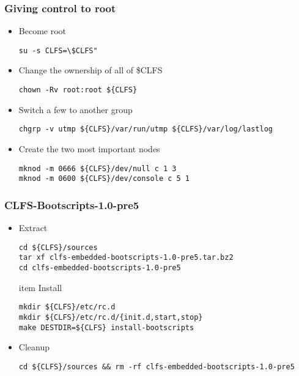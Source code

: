  \subsubsection{Giving control to root}
\begin{itemize}
  \item Become root
\begin{lstlisting}
su -s CLFS=\$CLFS"
\end{lstlisting}
  \item Change the ownership of all of \$CLFS
\begin{lstlisting}
chown -Rv root:root ${CLFS}
\end{lstlisting}
  \item Switch a few to another group
\begin{lstlisting}
chgrp -v utmp ${CLFS}/var/run/utmp ${CLFS}/var/log/lastlog
\end{lstlisting}
  \item Create the two most important nodes
\begin{lstlisting}
mknod -m 0666 ${CLFS}/dev/null c 1 3
mknod -m 0600 ${CLFS}/dev/console c 5 1
\end{lstlisting}
\end{itemize}	
 \subsubsection{CLFS-Bootscripts-1.0-pre5}
 \begin{itemize}
  \item Extract
\begin{lstlisting}
cd ${CLFS}/sources
tar xf clfs-embedded-bootscripts-1.0-pre5.tar.bz2
cd clfs-embedded-bootscripts-1.0-pre5
\end{lstlisting}
  item Install
\begin{lstlisting}
mkdir ${CLFS}/etc/rc.d
mkdir ${CLFS}/etc/rc.d/{init.d,start,stop}
make DESTDIR=${CLFS} install-bootscripts
\end{lstlisting}
  \item Cleanup
\begin{lstlisting}
cd ${CLFS}/sources && rm -rf clfs-embedded-bootscripts-1.0-pre5
\end{lstlisting}
\end{itemize}
